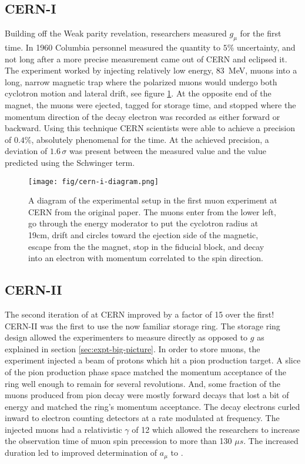\subsection{CERN-I}
Building off the Weak parity revelation, researchers measured $g_\mu$ for the first time.  In 1960 Columbia personnel measured the quantity to $5\%$ uncertainty, and not long after a more precise measurement came out of CERN and eclipsed it.  The experiment worked by injecting relatively low energy, \SI{83}{\MeV}, muons into a long, narrow magnetic trap where the polarized muons would undergo both cyclotron motion and lateral drift, see figure \ref{fig:cern-i-diagram}. At the opposite end of the magnet, the muons were ejected, tagged for storage time, and stopped where the momentum direction of the decay electron was recorded as either forward or backward.  Using this technique CERN scientists were able to achieve a precision of $0.4\%$, absolutely phenomenal for the time\cite{cern-i}.  At the achieved precision, a deviation of $1.6\,\sigma$ was present between the measured value and the value predicted using the Schwinger term\cite{47y-muon-g-2}.

\begin{figure}
\centering
\texttt{[image: fig/cern-i-diagram.png]}
\label{fig:cern-i-diagram}
\caption{A diagram of the experimental setup in the first muon \gmtwo experiment at CERN from the original paper\cite{cern-i}. The muons enter from the lower left, go through the energy moderator to put the cyclotron radius at 19cm, drift and circles toward the ejection side of the magnetic, escape from the the magnet, stop in the fiducial block, and decay into an electron with momentum correlated to the spin direction.}
\end{figure}

\subsection{CERN-II}
The second iteration of \mugmtwo at CERN improved by a factor of 15 over the first!  CERN-II was the first \mugmtwo to use the now familiar storage ring.  The storage ring design allowed the experimenters to measure \gmtwo directly as opposed to $g$ as explained in section \ref{sec:expt-big-picture}. In order to store muons, the experiment injected a beam of protons which hit a pion production target.  A slice of the pion production phase space matched the momentum acceptance of the ring well enough to remain for several revolutions. And, some fraction of the muons produced from pion decay were mostly forward decays that lost a bit of energy and matched the ring's momentum acceptance.  The decay electrons curled inward to electron counting detectors at a rate modulated at \gmtwo frequency.  The injected muons had a relativistic $\gamma$ of 12 which allowed the researchers to increase the observation time of muon spin precession to more than 130 $\mu s$.  The increased duration led to improved determination of $a_\mu$ to \cite{47y-muon-g-2}.

